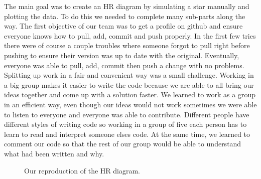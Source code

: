 \documentclass[10pt]{article}
\begin{document}
The main goal was to create an HR diagram by simulating a star manually and plotting the data. To do this we needed to complete many sub-parts along the way. The first objective of our team was to get a profile on github and ensure everyone knows how to pull, add, commit and push properly. In the first few tries there were of course a couple troubles where someone forgot to pull right before pushing to ensure their version was up to date with the original. Eventually, everyone was able to pull, add, commit then push a change with no problems. Splitting up work in a fair and convenient way was a small challenge. Working in a big group makes it easier to write the code because we are able to all bring our ideas together and come up with a solution faster. We learned to work as a group in an efficient way, even though our ideas would not work sometimes we were able to listen to everyone and everyone was able to contribute. Different people have different styles of writing code so working in a group of five each person has to learn to read and interpret someone elses code. At the same time, we learned to comment our code so that the rest of our group would be able to understand what had been written and why.\\

\begin{figure}[p]
 \begin{centering}
  
  \caption{Our reproduction of the HR diagram.}
\label{fig:HR}
 \end{centering}
\end{figure}
\end{document}

